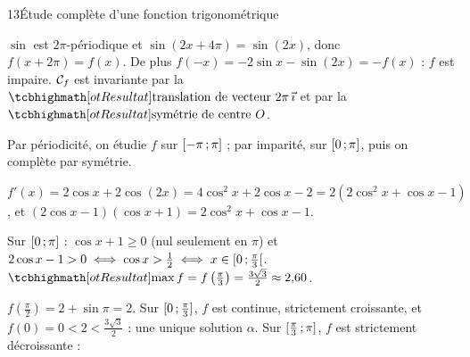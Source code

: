 \begin{corrige}{13}{Étude complète d'une fonction trigonométrique}
\begin{questions}
  \item $\sin$ est $2\pi$-périodique et $\sin(2x+4\pi)=\sin(2x)$, donc $f(x+2\pi)=f(x)$. De plus
    $f(-x)=-2\sin x-\sin(2x)=-f(x)$ : $f$ est impaire. $\mathcal{C}_f$ est invariante par la $\res{\text{translation de vecteur }2\pi\,\vec\imath}$
    et par la $\res{\text{symétrie de centre }O}$.
  \item Par périodicité, on étudie $f$ sur $\mathopen{[}-\pi\,{;}\,\pi\mathclose{]}$ ; par imparité, sur $\mathopen{[}0\,{;}\,\pi\mathclose{]}$, puis on complète par symétrie.
\end{questions}
\noindent
\begin{minipage}[t]{0.54\linewidth}\vspace{0pt}\raggedright
\begin{questions}[resume]
  \item $f'(x)=2\cos x+2\cos(2x)=4\cos^{2}x+2\cos x-2=2\left(2\cos^{2}x+\cos x-1\right)$, et
    $(2\cos x-1)(\cos x+1)=2\cos^{2}x+\cos x-1$.
  \item Sur $\mathopen{[}0\,{;}\,\pi\mathclose{]}$ : $\cos x+1\geq0$ (nul seulement en $\pi$) et $2\cos x-1>0\iff\cos x>\frac12\iff x\in\mathopen{[}0\,{;}\,\frac{\pi}{3}\mathclose{[}$.
    $\res{\max f=f\left(\frac{\pi}{3}\right)=\frac{3\sqrt3}{2}\approx2{,}60}$.
\end{questions}
\end{minipage}\hfill
\begin{minipage}[t]{0.42\linewidth}\vspace{1mm}
\centering
\begin{tableau}
\end{tableau}
\end{minipage}
\noindent
\begin{minipage}[t]{0.5\linewidth}\vspace{0pt}\raggedright
\begin{questions}[start=5]
  \item $f\left(\frac{\pi}{2}\right)=2+\sin\pi=2$. Sur $\mathopen{[}0\,{;}\,\frac{\pi}{3}\mathclose{]}$, $f$ est continue, strictement croissante, et
    $f(0)=0<2<\frac{3\sqrt3}{2}$ : une unique solution $\alpha$. Sur $\mathopen{[}\frac{\pi}{3}\,{;}\,\pi\mathclose{]}$, $f$ est strictement décroissante :

\end{questions}
\end{minipage}
\end{corrige}

